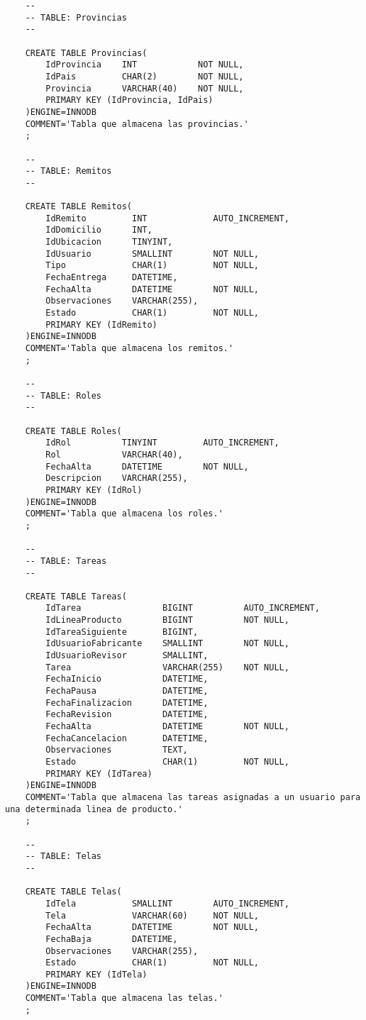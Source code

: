 \begin{lstlisting}
	-- 
	-- TABLE: Provincias 
	--

	CREATE TABLE Provincias(
		IdProvincia    INT            NOT NULL,
		IdPais         CHAR(2)        NOT NULL,
		Provincia      VARCHAR(40)    NOT NULL,
		PRIMARY KEY (IdProvincia, IdPais)
	)ENGINE=INNODB
	COMMENT='Tabla que almacena las provincias.'
	;

	-- 
	-- TABLE: Remitos 
	--

	CREATE TABLE Remitos(
		IdRemito         INT             AUTO_INCREMENT,
		IdDomicilio      INT,
		IdUbicacion      TINYINT,
		IdUsuario        SMALLINT        NOT NULL,
		Tipo             CHAR(1)         NOT NULL,
		FechaEntrega     DATETIME,
		FechaAlta        DATETIME        NOT NULL,
		Observaciones    VARCHAR(255),
		Estado           CHAR(1)         NOT NULL,
		PRIMARY KEY (IdRemito)
	)ENGINE=INNODB
	COMMENT='Tabla que almacena los remitos.'
	;

	-- 
	-- TABLE: Roles 
	--

	CREATE TABLE Roles(
		IdRol          TINYINT         AUTO_INCREMENT,
		Rol            VARCHAR(40),
		FechaAlta      DATETIME        NOT NULL,
		Descripcion    VARCHAR(255),
		PRIMARY KEY (IdRol)
	)ENGINE=INNODB
	COMMENT='Tabla que almacena los roles.'
	;

	-- 
	-- TABLE: Tareas 
	--

	CREATE TABLE Tareas(
		IdTarea                BIGINT          AUTO_INCREMENT,
		IdLineaProducto        BIGINT          NOT NULL,
		IdTareaSiguiente       BIGINT,
		IdUsuarioFabricante    SMALLINT        NOT NULL,
		IdUsuarioRevisor       SMALLINT,
		Tarea                  VARCHAR(255)    NOT NULL,
		FechaInicio            DATETIME,
		FechaPausa             DATETIME,
		FechaFinalizacion      DATETIME,
		FechaRevision          DATETIME,
		FechaAlta              DATETIME        NOT NULL,
		FechaCancelacion       DATETIME,
		Observaciones          TEXT,
		Estado                 CHAR(1)         NOT NULL,
		PRIMARY KEY (IdTarea)
	)ENGINE=INNODB
	COMMENT='Tabla que almacena las tareas asignadas a un usuario para una determinada linea de producto.'
	;

	-- 
	-- TABLE: Telas 
	--

	CREATE TABLE Telas(
		IdTela           SMALLINT        AUTO_INCREMENT,
		Tela             VARCHAR(60)     NOT NULL,
		FechaAlta        DATETIME        NOT NULL,
		FechaBaja        DATETIME,
		Observaciones    VARCHAR(255),
		Estado           CHAR(1)         NOT NULL,
		PRIMARY KEY (IdTela)
	)ENGINE=INNODB
	COMMENT='Tabla que almacena las telas.'
	;


\end{lstlisting}
